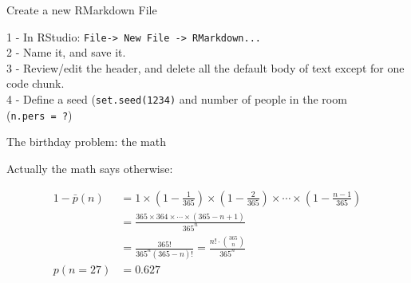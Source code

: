 \begin{frame}[fragile]{Create a new RMarkdown File}

1 - In RStudio:
\texttt{File-\textgreater{}\ New\ File\ -\textgreater{}\ RMarkdown...}\\
2 - Name it, and save it.\\
3 - Review/edit the header, and delete all the default body of text
except for one code chunk.\\
4 - Define a seed (\texttt{set.seed(1234)} and number of people in the
room (\texttt{n.pers\ =\ ?})

\end{frame}

\begin{frame}{The birthday problem: the math}

Actually the math says otherwise:

\begin{align} 
 1 - \bar p(n) &= 1 \times \left(1-\frac{1}{365}\right) \times \left(1-\frac{2}{365}\right) \times \cdots \times \left(1-\frac{n-1}{365}\right) \nonumber  \\  &= \frac{ 365 \times 364 \times \cdots \times (365-n+1) }{ 365^n } \nonumber \\ &= \frac{ 365! }{ 365^n (365-n)!} = \frac{n!\cdot\binom{365}{n}}{365^n}\\
p(n= 27) &= 0.627  \nonumber
\end{align}

\end{frame}

